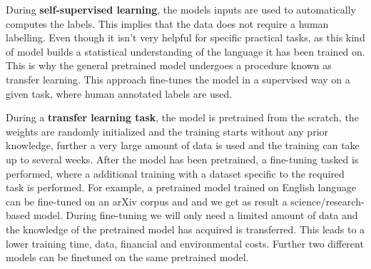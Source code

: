 
During \textbf{self-supervised learning}, the models inputs are used to automatically computes the labels.
This implies that the data does not require a human labelling.
Even though it isn't very helpful for specific practical tasks, as this kind of model builds a statistical understanding of the language it has been trained on.
This is why the general pretrained model undergoes a procedure known as transfer learning.
This approach fine-tunes the model in a supervised way on a given task, where human annotated labels are used.

During a \textbf{transfer learning task}, the model is pretrained from the scratch, the weights are randomly initialized and the training starts without any prior knowledge, further a very large amount of data is used and the training can take up to several weeks.
After the model has been pretrained, a fine-tuning tasked is performed, where a additional training with a dataset specific to the required task is performed.
For example, a pretrained model trained on English language can be fine-tuned on an arXiv corpus and and we get as result a science/research-based model.
During fine-tuning we will only need a limited amount of data and the knowledge of the pretrained model has acquired is transferred.
This leads to a lower training time, data, financial and environmental costs.
Further two different models can be finetuned on the same pretrained model.